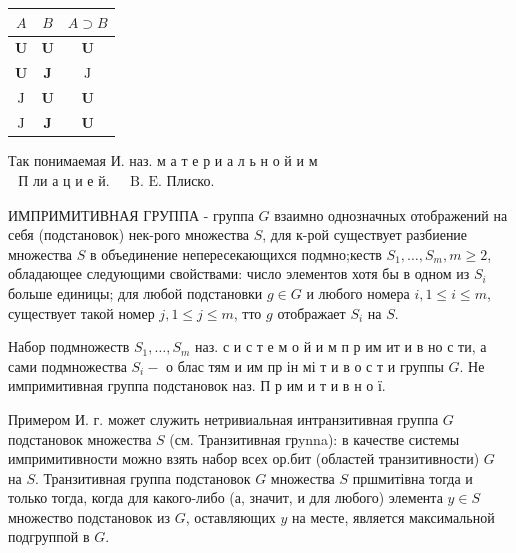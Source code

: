 \documentclass[10pt]{article}
\begin{document}
\begin{center}

\begin{tabular}{c|c|c}

\hline

$A$ & $B$ & $A \supset B$ \\

\hline

$\mathbf{U}$ & $\mathbf{U}$ & $\mathbf{U}$ \\

$\mathbf{U}$ & $\mathbf{J}$ & $\mathrm{J}$ \\

$\mathrm{J}$ & $\mathbf{U}$ & $\mathbf{U}$ \\

$\mathrm{J}$ & $\mathbf{J}$ & $\mathbf{U}$ \\

\hline

\end{tabular}

\end{center}



Так понимаемая И. наз. м а т е р и а л ь н о й и м$\begin{array}{lll}\text { П ли а ц и е й. } & \text { B. E. Плиско. }\end{array}$



ИМПРИМИТИВНАЯ ГРУППА - группа $G$ взаимно однозначных отображений на себя (подстановок) нек-рого множества $S$, для к-рой существует разбиение множества $S$ в объединение непересекающихся подмно;кеств $S_{1}, \ldots, S_{m}, m \geqslant 2$, обладающее следующими свойствами: число элементов хотя бы в одном из $S_{i}$ больше единицы; для любой подстановки $g \in G$ и любого номера $i, 1 \leqslant i \leqslant m$, существует такой номер $j, 1 \leqslant j \leqslant m$, тто $g$ отображает $S_{i}$ на $S$.



Набор подмножеств $S_{1}, \ldots, S_{m}$ наз. с и с т е м о й и м п р им ит и в но с ти, а сами подмножества $S_{i}-$ о блас тям и им пр ін мі т и в о с т и группы $G$. Не импримитивная группа подстановок наз. П р им и т и в н о ї.



Примером И. г. может служить нетривиальная интранзитивная группа $G$ подстановок множества $S$ (см. Транзитивная грynna): в качестве системы импримитивности можно взять набор всех ор.бит (областей транзитивности) $G$ на $S$. Транзитивная группа подстановок $G$ множества $S$ пршмитівна тогда и только тогда, когда для какого-либо (а, значит, и для любого) элемента $y \in S$ множество подстановок из $G$, оставляющих $y$ на месте, является максимальной подгруппой в $G$.
\end{document}
